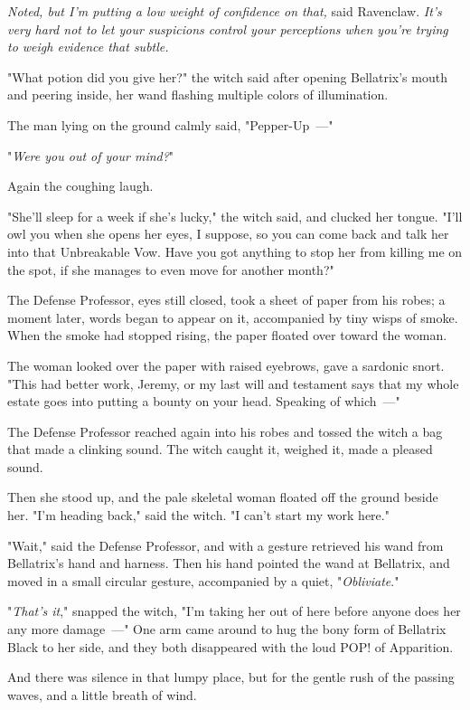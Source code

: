 \emph{Noted, but I'm putting a low weight of confidence on that,} said
Ravenclaw. \emph{It's very hard not to let your suspicions control your
perceptions when you're trying to weigh evidence that subtle.}

"What potion did you give her?" the witch said after opening Bellatrix's mouth
and peering inside, her wand flashing multiple colors of illumination.

The man lying on the ground calmly said, "Pepper-Up~---"

"\emph{Were you out of your mind?}"

Again the coughing laugh.

"She'll sleep for a week if she's lucky," the witch said, and clucked her
tongue. "I'll owl you when she opens her eyes, I suppose, so you can come back
and talk her into that Unbreakable Vow. Have you got anything to stop her from
killing me on the spot, if she manages to even move for another month?"

The Defense Professor, eyes still closed, took a sheet of paper from his robes;
a moment later, words began to appear on it, accompanied by tiny wisps of
smoke. When the smoke had stopped rising, the paper floated over toward the
woman.

The woman looked over the paper with raised eyebrows, gave a sardonic snort.
"This had better work, Jeremy, or my last will and testament says that my whole
estate goes into putting a bounty on your head. Speaking of which~---"

The Defense Professor reached again into his robes and tossed the witch a bag
that made a clinking sound. The witch caught it, weighed it, made a pleased
sound.

Then she stood up, and the pale skeletal woman floated off the ground beside
her. "I'm heading back," said the witch. "I can't start my work here."

"Wait," said the Defense Professor, and with a gesture retrieved his wand from
Bellatrix's hand and harness. Then his hand pointed the wand at Bellatrix, and
moved in a small circular gesture, accompanied by a quiet, "\emph{Obliviate}."

"\emph{That's it}," snapped the witch, "I'm taking her out of here before
anyone does her any more damage~---" One arm came around to hug the bony form of
Bellatrix Black to her side, and they both disappeared with the loud POP! of
Apparition.

And there was silence in that lumpy place, but for the gentle rush of the
passing waves, and a little breath of wind.

